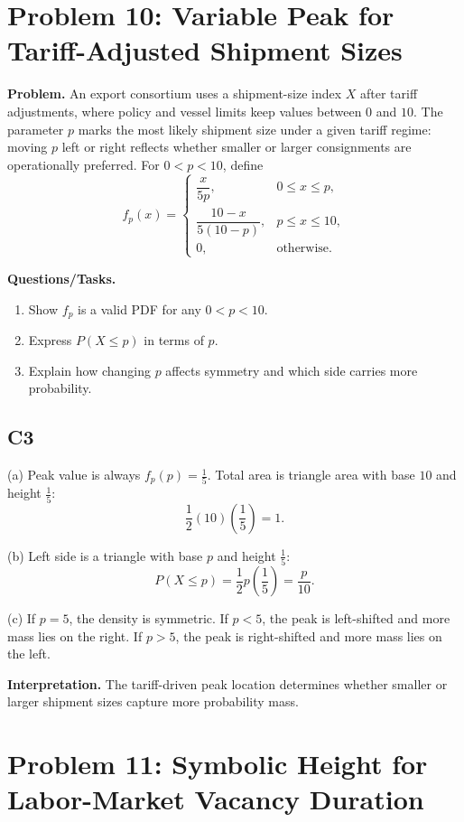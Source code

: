 \section{Problem 10: Variable Peak for Tariff-Adjusted Shipment Sizes}

\textbf{Problem.}
An export consortium uses a shipment-size index $X$ after tariff adjustments, where policy and vessel limits keep values between $0$ and $10$. The parameter $p$ marks the most likely shipment size under a given tariff regime: moving $p$ left or right reflects whether smaller or larger consignments are operationally preferred. For $0<p<10$, define
\[
f_p(x)=\begin{cases}
\dfrac{x}{5p}, & 0\le x\le p,\\
\dfrac{10-x}{5(10-p)}, & p\le x\le 10,\\
0, & \text{otherwise.}
\end{cases}
\]

\textbf{Questions/Tasks.}
\begin{enumerate}[label=(\alph*)]
\item Show $f_p$ is a valid PDF for any $0<p<10$.
\item Express $P(X\le p)$ in terms of $p$.
\item Explain how changing $p$ affects symmetry and which side carries more probability.
\end{enumerate}

\subsection*{C3}
(a) Peak value is always $f_p(p)=\frac15$.
Total area is triangle area with base $10$ and height $\frac15$:
\[
\frac12(10)\left(\frac15\right)=1.
\]

(b) Left side is a triangle with base $p$ and height $\frac15$:
\[
P(X\le p)=\frac12 p\left(\frac15\right)=\frac{p}{10}.
\]

(c) If $p=5$, the density is symmetric.
If $p<5$, the peak is left-shifted and more mass lies on the right.
If $p>5$, the peak is right-shifted and more mass lies on the left.

\textbf{Interpretation.}
The tariff-driven peak location determines whether smaller or larger shipment sizes capture more probability mass.

\section{Problem 11: Symbolic Height for Labor-Market Vacancy Duration}

